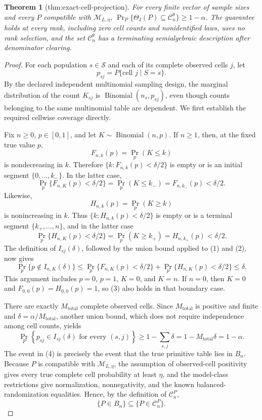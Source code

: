 \documentclass{article}
\newtheorem{theorem}{Theorem}
\begin{document}
\begin{theorem}[thm:exact-cell-projection]\label{thm:exact-cell-projection}
For every finite vector of sample sizes and every \(P\) compatible with \(\mathcal M_{L,\eta}\), \(\Pr_P\{\Theta_I(P)\subseteq\mathcal C_n^\theta\}\ge1-\alpha\). The guarantee holds at every rank, including zero cell counts and nonidentified laws, uses no rank selection, and the set \(\mathcal C_n^\theta\) has a terminating semialgebraic description after denominator clearing.
\end{theorem}
\begin{proof}
For each population \(s\in\mathcal S\) and each of its complete observed cells \(j\), let
\[
p_{sj}=P\{\text{cell }j\mid S=s\}.
\]
By the declared independent multinomial sampling design, the marginal distribution of the count \(K_{sj}\) is \(\operatorname{Binomial}(n_s,p_{sj})\), even though counts belonging to the same multinomial table are dependent.  We first establish the required cellwise coverage directly.

Fix \(n\geq 0\), \(p\in[0,1]\), and let \(K\sim\operatorname{Binomial}(n,p)\).  If \(n\geq 1\), then, at the fixed true value \(p\),
\[
F_{n,k}(p)=\Pr_p(K\leq k)
\]
is nondecreasing in \(k\).  Therefore \(\{k:F_{n,k}(p)<\delta/2\}\) is empty or is an initial segment \(\{0,\ldots,k_-\}\).  In the latter case,
\[
\Pr_p\{F_{n,K}(p)<\delta/2\}
=\Pr_p(K\leq k_-)
=F_{n,k_-}(p)
<\delta/2.
\tag{1}
\]
Likewise,
\[
H_{n,k}(p)=\Pr_p(K\geq k)
\]
is nonincreasing in \(k\).  Thus \(\{k:H_{n,k}(p)<\delta/2\}\) is empty or is a terminal segment \(\{k_+,\ldots,n\}\), and in the latter case
\[
\Pr_p\{H_{n,K}(p)<\delta/2\}
=\Pr_p(K\geq k_+)
=H_{n,k_+}(p)
<\delta/2.
\tag{2}
\]
The definition of \(I_{sj}(\delta)\), followed by the union bound applied to (1) and (2), now gives
\[
\Pr_p\{p\notin I_{n,K}(\delta)\}
\leq
\Pr_p\{F_{n,K}(p)<\delta/2\}
+\Pr_p\{H_{n,K}(p)<\delta/2\}
\leq\delta.
\tag{3}
\]
This argument includes \(p=0\), \(p=1\), \(K=0\), and \(K=n\).  If \(n=0\), then \(K=0\) and \(F_{0,0}(p)=H_{0,0}(p)=1\), so (3) also holds in that boundary case.

There are exactly \(M_{\mathrm{total}}\) complete observed cells.  Since \(M_{\mathrm{total}}\) is positive and finite and \(\delta=\alpha/M_{\mathrm{total}}\), another union bound, which does not require independence among cell counts, yields
\[
\Pr_P\left\{p_{sj}\in I_{sj}(\delta)
\text{ for every }(s,j)\right\}
\geq 1-\sum_{s,j}\delta
=1-M_{\mathrm{total}}\delta
=1-\alpha.
\tag{4}
\]
The event in (4) is precisely the event that the true primitive table lies in \(B_n\).  Because \(P\) is compatible with \(\mathcal M_{L,\eta}\), the assumption of observed-cell positivity gives every true complete cell probability at least \(\eta\), and the model-class restrictions give normalization, nonnegativity, and the known balanced-randomization equalities.  Hence, by the definition of \(\mathcal C_n^P\),
\[
\{P\in B_n\}\subseteq\{P\in\mathcal C_n^P\}.
\tag{5}
\]


\end{proof}
\end{document}
